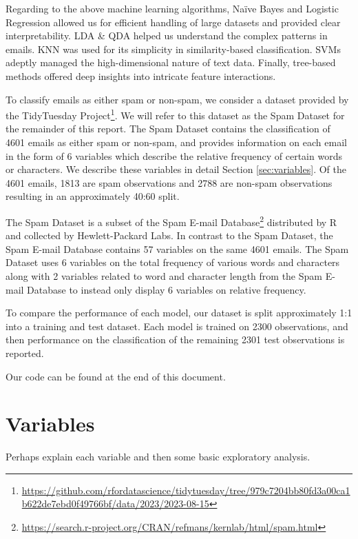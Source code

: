\documentclass[
]{article}
\begin{document}
Regarding to the above machine learning algorithms, Naïve Bayes and Logistic Regression allowed us for efficient handling of large datasets and provided clear interpretability. LDA \& QDA helped us understand the complex patterns in emails. KNN was used for its simplicity in similarity-based classification. SVMs adeptly managed the high-dimensional nature of text data. Finally, tree-based methods offered deep insights into intricate feature interactions.

To classify emails as either spam or non-spam, we consider a dataset provided by the TidyTuesday Project\footnote{\url{https://github.com/rfordatascience/tidytuesday/tree/979c7204bb80fd3a00ca1b622de7ebd0f49766bf/data/2023/2023-08-15}}. We will refer to this dataset as the Spam Dataset for the remainder of this report. The Spam Dataset contains the classification of 4601 emails as either spam or non-spam, and provides information on each email in the form of 6 variables which describe the relative frequency of certain words or characters. We describe these variables in detail Section \ref{sec:variables}. Of the 4601 emails, 1813 are spam observations and 2788 are non-spam observations resulting in an approximately 40:60 split.

The Spam Dataset is a subset of the Spam E-mail Database\footnote{\url{https://search.r-project.org/CRAN/refmans/kernlab/html/spam.html}} distributed by R and collected by Hewlett-Packard Labs. In contrast to the Spam Dataset, the Spam E-mail Database contains 57 variables on the same 4601 emails. The Spam Dataset uses 6 variables on the total frequency of various words and characters along with 2 variables related to word and character length from the Spam E-mail Database to instead only display 6 variables on relative frequency.

To compare the performance of each model, our dataset is split approximately 1:1 into a training and test dataset. Each model is trained on 2300 observations, and then performance on the classification of the remaining 2301 test observations is reported.

Our code can be found at the end of this document.

\hypertarget{variables}{%
\section{\texorpdfstring{Variables \label{sec:variables}}{Variables }}\label{variables}}

Perhaps explain each variable and then some basic exploratory analysis.
\end{document}
